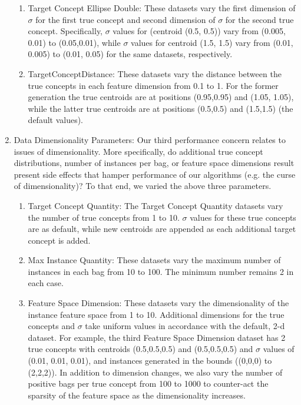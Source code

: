 \documentclass[12pt,dvips]{report}
\numberwithin{equation}{section}
\begin{document}
\begin{enumerate}
\begin{enumerate}
	\item Target Concept Ellipse Double: These datasets vary the first dimension of $\sigma$ for the first true concept and second dimension of $\sigma$ for the second true concept.  Specifically, $\sigma$ values for (centroid (0.5, 0.5)) vary from (0.005, 0.01) to (0.05,0.01), while $\sigma$ values for centroid (1.5, 1.5) vary from (0.01, 0.005) to (0.01, 0.05) for the same datasets, respectively.
	
	\item TargetConceptDistance: These datasets vary the distance between the true concepts in each feature dimension from 0.1 to 1.  For the former generation the true centroids are at positions (0.95,0.95) and  (1.05, 1.05), while the latter true centroids are at positions (0.5,0.5) and (1.5,1.5) (the default values).
	
	\end{enumerate}

\item Data Dimensionality Parameters: Our third performance concern relates to issues of dimensionality.  More specifically, do additional true concept distributions, number of instances per bag, or feature space dimensions result present side effects that hamper performance of our algorithms (e.g. the curse of dimensionality)?  To that end, we varied the above three parameters.
	
	\begin{enumerate}
	
	\item Target Concept Quantity: The Target Concept Quantity datasets vary the number of true concepts from 1 to 10.  $\sigma$ values for these true concepts are as default, while new centroids are appended as each additional target concept is added.  
	
	\item Max Instance Quantity: These datasets vary the maximum number of instances in each bag from 10 to 100.  The minimum number remains 2 in each case.
	
	\item Feature Space Dimension: These datasets vary the dimensionality of the instance feature space from 1 to 10.  Additional dimensions for the true concepts and $\sigma$ take uniform values in accordance with the default, 2-d dataset.  For example, the third Feature Space Dimension dataset has 2 true concepts with centroids (0.5,0.5,0.5) and (0.5,0.5,0.5) and $\sigma$ values of (0.01, 0.01, 0.01), and instances generated in the bounds ((0,0,0) to (2,2,2)).  In addition to dimension changes, we also vary the number of positive bags per true concept from 100 to 1000 to counter-act the sparsity of the feature space as the dimensionality increases.

	\end{enumerate}

\end{enumerate}
\end{document}

